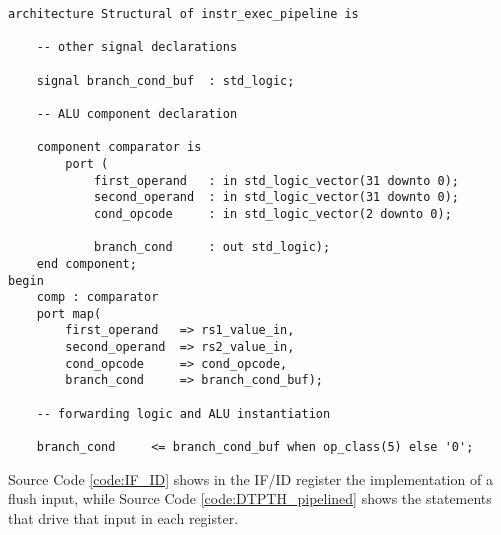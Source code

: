 \begin{verbatim}
architecture Structural of instr_exec_pipeline is
    
    -- other signal declarations

    signal branch_cond_buf  : std_logic;

    -- ALU component declaration
    
    component comparator is
        port ( 
            first_operand   : in std_logic_vector(31 downto 0);
            second_operand  : in std_logic_vector(31 downto 0);
            cond_opcode     : in std_logic_vector(2 downto 0);
            
            branch_cond     : out std_logic);
    end component;
begin
    comp : comparator 
    port map(
        first_operand   => rs1_value_in,
        second_operand  => rs2_value_in,
        cond_opcode     => cond_opcode,
        branch_cond     => branch_cond_buf); 
    
    -- forwarding logic and ALU instantiation
    
    branch_cond     <= branch_cond_buf when op_class(5) else '0';
\end{verbatim}

Source Code \ref{code:IF_ID} shows in the IF/ID register the implementation of a flush input, while Source Code \ref{code:DTPTH_pipelined} shows the statements that drive that input in each register.

